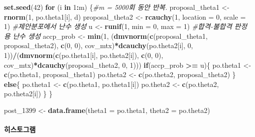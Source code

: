 \documentclass[
]{article}
\newenvironment{Shaded}{\begin{snugshade}}{\end{snugshade}}
\newcommand{\AttributeTok}[1]{\textcolor[rgb]{0.13,0.29,0.53}{#1}}
\newcommand{\CommentTok}[1]{\textcolor[rgb]{0.56,0.35,0.01}{\textit{#1}}}
\newcommand{\ControlFlowTok}[1]{\textcolor[rgb]{0.13,0.29,0.53}{\textbf{#1}}}
\newcommand{\DecValTok}[1]{\textcolor[rgb]{0.00,0.00,0.81}{#1}}
\newcommand{\FunctionTok}[1]{\textcolor[rgb]{0.13,0.29,0.53}{\textbf{#1}}}
\newcommand{\NormalTok}[1]{#1}
\newcommand{\OtherTok}[1]{\textcolor[rgb]{0.56,0.35,0.01}{#1}}
\newcommand{\SpecialCharTok}[1]{\textcolor[rgb]{0.81,0.36,0.00}{\textbf{#1}}}
\begin{document}
\begin{Shaded}
\begin{Highlighting}[]
\FunctionTok{set.seed}\NormalTok{(}\DecValTok{42}\NormalTok{)}
\ControlFlowTok{for}\NormalTok{ (i }\ControlFlowTok{in} \DecValTok{1}\SpecialCharTok{:}\NormalTok{m) \{}\CommentTok{\#m = 5000회 동안 반복.}
\NormalTok{  proposal\_theta1 }\OtherTok{\textless{}{-}} \FunctionTok{rnorm}\NormalTok{(}\DecValTok{1}\NormalTok{, po.theta1[i], d)}
\NormalTok{  proposal\_theta2 }\OtherTok{\textless{}{-}} \FunctionTok{rcauchy}\NormalTok{(}\DecValTok{1}\NormalTok{, }\AttributeTok{location =} \DecValTok{0}\NormalTok{, }\AttributeTok{scale =} \DecValTok{1}\NormalTok{) }\CommentTok{\#제안분포에서 난수 생성}
\NormalTok{  u }\OtherTok{\textless{}{-}} \FunctionTok{runif}\NormalTok{(}\DecValTok{1}\NormalTok{, }\AttributeTok{min =} \DecValTok{0}\NormalTok{, }\AttributeTok{max =} \DecValTok{1}\NormalTok{) }\CommentTok{\#합격{-}불합격 판정용 난수 생성}
\NormalTok{  accp\_prob }\OtherTok{\textless{}{-}} \FunctionTok{min}\NormalTok{(}\DecValTok{1}\NormalTok{, (}\FunctionTok{dmvnorm}\NormalTok{(}\FunctionTok{c}\NormalTok{(proposal\_theta1, proposal\_theta2), }\FunctionTok{c}\NormalTok{(}\DecValTok{0}\NormalTok{, }\DecValTok{0}\NormalTok{), cov\_mtx)}\SpecialCharTok{*}\FunctionTok{dcauchy}\NormalTok{(po.theta2[i], }\DecValTok{0}\NormalTok{, }\DecValTok{1}\NormalTok{))}\SpecialCharTok{/}\NormalTok{(}\FunctionTok{dmvnorm}\NormalTok{(}\FunctionTok{c}\NormalTok{(po.theta1[i], po.theta2[i]), }\FunctionTok{c}\NormalTok{(}\DecValTok{0}\NormalTok{, }\DecValTok{0}\NormalTok{), cov\_mtx)}\SpecialCharTok{*}\FunctionTok{dcauchy}\NormalTok{(proposal\_theta2, }\DecValTok{0}\NormalTok{, }\DecValTok{1}\NormalTok{)))}
  \ControlFlowTok{if}\NormalTok{(accp\_prob }\SpecialCharTok{\textgreater{}=}\NormalTok{ u)\{}
\NormalTok{    po.theta1 }\OtherTok{\textless{}{-}} \FunctionTok{c}\NormalTok{(po.theta1, proposal\_theta1)}
\NormalTok{    po.theta2 }\OtherTok{\textless{}{-}} \FunctionTok{c}\NormalTok{(po.theta2, proposal\_theta2)}
\NormalTok{  \} }\ControlFlowTok{else}\NormalTok{\{}
\NormalTok{    po.theta1 }\OtherTok{\textless{}{-}} \FunctionTok{c}\NormalTok{(po.theta1, po.theta1[i])}
\NormalTok{    po.theta2 }\OtherTok{\textless{}{-}} \FunctionTok{c}\NormalTok{(po.theta2, po.theta2[i])}
\NormalTok{  \}}
\NormalTok{\}}

\NormalTok{post\_1399 }\OtherTok{\textless{}{-}} \FunctionTok{data.frame}\NormalTok{(}\AttributeTok{theta1 =}\NormalTok{ po.theta1, }\AttributeTok{theta2 =}\NormalTok{ po.theta2)}
\end{Highlighting}
\end{Shaded}

\paragraph{히스토그램}\label{uxd788uxc2a4uxd1a0uxadf8uxb7a8-2}
\end{document}
